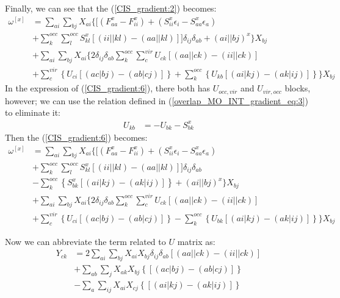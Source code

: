 Finally, we can see that the (\ref{CIS_gradient:2}) becomes:
\begin{align}
 \label{CIS_gradient:6}
\omega^{[x]} &= \sum_{ai}\sum_{bj}X_{ai}\Bigg\{\Big[  (F^{x}_{aa} -
F^{x}_{ii}) +
(S^{x}_{ii}\epsilon_{i} - S^{x}_{aa}\epsilon_{a})  \nonumber \\
&+\sum_{k}^{occ}\sum_{l}^{occ}S_{kl}^{x}[(ii||kl) -
(aa||kl)]\Big]\delta_{ij}\delta_{ab} + (ai||bj)^{x} \Bigg\} X_{bj} \nonumber
\\
&+
\sum_{ai}\sum_{bj}X_{ai}\Bigg\{2\delta_{ij}\delta_{ab}\sum_{k}^{occ}\sum_{c}^{
vir}U_{ck}[(aa||ck) - (ii||ck)]\nonumber \\
& +\sum_{c}^{vir}\left\{ U_{ci}\left[(ac|bj) - (ab|cj)\right] \right\}
+\sum_{k}^{occ}\left\{ U_{kb}\left[(ai|kj)-(ak|ij)\right] \right\} \Bigg\}X_{bj}
\end{align}
In the expression of (\ref{CIS_gradient:6}), there both has $U_{occ, vir}$
and $U_{vir, occ}$ blocks, however; we can use the relation defined in
(\ref{overlap_MO_INT_gradient_eq:3}) to eliminate it:
\begin{align}
 \label{CIS_gradient:7}
U_{kb} &= -U_{bk} - S_{bk}^{x}
\end{align}
Then the (\ref{CIS_gradient:6}) becomes:
\begin{align}
 \label{CIS_gradient:7}
\omega^{[x]} &= \sum_{ai}\sum_{bj}X_{ai}\Bigg\{\Big[  (F^{x}_{aa} -
F^{x}_{ii}) +
(S^{x}_{ii}\epsilon_{i} - S^{x}_{aa}\epsilon_{a})  \nonumber \\
&+\sum_{k}^{occ}\sum_{l}^{occ}S_{kl}^{x}[(ii||kl) -
(aa||kl)]\Big]\delta_{ij}\delta_{ab} \nonumber
\\ 
& -\sum_{k}^{occ}\left\{S^{x}_{bk}\left[(ai|kj)-(ak|ij)\right] \right\} +
(ai||bj)^{x} \Bigg\} X_{bj} 
\nonumber \\
&+
\sum_{ai}\sum_{bj}X_{ai}\Bigg\{2\delta_{ij}\delta_{ab}\sum_{k}^{occ}\sum_{c}^{
vir}U_{ck}[(aa||ck) - (ii||ck)]\nonumber \\
&+\sum_{c}^{vir}\left\{ U_{ci}\left[(ac|bj) - (ab|cj)\right] \right\}
-\sum_{k}^{occ}\left\{ U_{bk}\left[(ai|kj)-(ak|ij)\right] \right\} \Bigg\}X_{bj}
\end{align} 

Now we can abbreviate the term related to $U$ matrix as:
\begin{align} 
\label{CIS_gradient:8}
 Y_{ck} &= 2\sum_{ai}\sum_{bj}X_{ai}X_{bj}
\delta_{ij}\delta_{ab}[(aa||ck) - (ii||ck)]\nonumber \\
&+\sum_{ab}\sum_{j}X_{ak}X_{bj}\left\{\left[(ac|bj)
- (ab|cj)\right] \right\} \nonumber \\
&-\sum_{a}\sum_{ij}X_{ai}X_{cj}\left\{
\left[(ai|kj)-(ak|ij)\right] \right\} 
\end{align}


